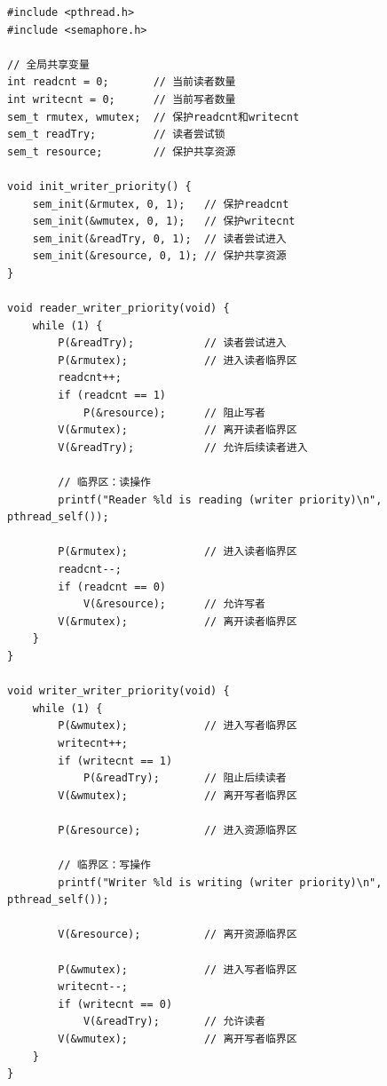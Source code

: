\begin{lstlisting}[style=CStyle]
#include <pthread.h>
#include <semaphore.h>

// 全局共享变量
int readcnt = 0;       // 当前读者数量
int writecnt = 0;      // 当前写者数量
sem_t rmutex, wmutex;  // 保护readcnt和writecnt
sem_t readTry;         // 读者尝试锁
sem_t resource;        // 保护共享资源

void init_writer_priority() {
    sem_init(&rmutex, 0, 1);   // 保护readcnt
    sem_init(&wmutex, 0, 1);   // 保护writecnt
    sem_init(&readTry, 0, 1);  // 读者尝试进入
    sem_init(&resource, 0, 1); // 保护共享资源
}

void reader_writer_priority(void) {
    while (1) {
        P(&readTry);           // 读者尝试进入
        P(&rmutex);            // 进入读者临界区
        readcnt++;
        if (readcnt == 1)
            P(&resource);      // 阻止写者
        V(&rmutex);            // 离开读者临界区
        V(&readTry);           // 允许后续读者进入
        
        // 临界区：读操作
        printf("Reader %ld is reading (writer priority)\n", pthread_self());
        
        P(&rmutex);            // 进入读者临界区
        readcnt--;
        if (readcnt == 0)
            V(&resource);      // 允许写者
        V(&rmutex);            // 离开读者临界区
    }
}

void writer_writer_priority(void) {
    while (1) {
        P(&wmutex);            // 进入写者临界区
        writecnt++;
        if (writecnt == 1)
            P(&readTry);       // 阻止后续读者
        V(&wmutex);            // 离开写者临界区
        
        P(&resource);          // 进入资源临界区
        
        // 临界区：写操作
        printf("Writer %ld is writing (writer priority)\n", pthread_self());
        
        V(&resource);          // 离开资源临界区
        
        P(&wmutex);            // 进入写者临界区
        writecnt--;
        if (writecnt == 0)
            V(&readTry);       // 允许读者
        V(&wmutex);            // 离开写者临界区
    }
}
\end{lstlisting}

